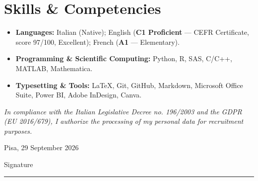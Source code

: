 \documentclass[10pt,a4paper]{article}
\begin{document}
\section{Skills \& Competencies}

\begin{itemize}[leftmargin=1.5em]
    \item \textbf{Languages:} Italian (Native); English (\textbf{C1 Proficient} --- CEFR Certificate, score 97/100, Excellent); French (\textbf{A1} --- Elementary).
    \item \textbf{Programming \& Scientific Computing:} Python, R, SAS, C/C++, MATLAB, Mathematica.
    \item \textbf{Typesetting \& Tools:} \LaTeX, Git, GitHub, Markdown, Microsoft Office Suite, Power BI, Adobe InDesign, Canva.
\end{itemize}

\vspace{6pt}
\begin{center}
    \scriptsize\color{textlight}
    \textit{In compliance with the Italian Legislative Decree no. 196/2003 and the GDPR (EU 2016/679), I authorize the processing of my personal data for recruitment purposes.}
\end{center}


\vspace{1.5cm}

\noindent
\begin{minipage}[t]{0.45\textwidth}
Pisa, 29 September 2026
\end{minipage}
\hfill
\begin{minipage}[t]{0.45\textwidth}
\centering
Signature

\vspace{1.5cm}

\rule{5cm}{0.4pt}
\end{minipage}
\end{document}
